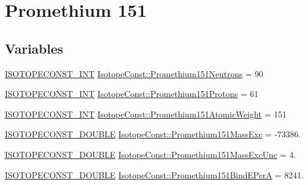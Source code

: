 \hypertarget{group___isotope_const-_promethium-_pm151}{}\section{Promethium 151}
\label{group___isotope_const-_promethium-_pm151}
\subsection*{Variables}
\begin{DoxyCompactItemize}
\item 
\mbox{\hyperlink{group___isotope_const-_macros_ga5f18360b3e99483a35c32d789e62621c}{I\+S\+O\+T\+O\+P\+E\+C\+O\+N\+S\+T\+\_\+\+I\+NT}} \mbox{\hyperlink{group___isotope_const-_promethium-_pm151_ga6160ed25a08d64d7d3850ccb4aec5af1}{Isotope\+Const\+::\+Promethium151\+Neutrons}} = 90
\item 
\mbox{\hyperlink{group___isotope_const-_macros_ga5f18360b3e99483a35c32d789e62621c}{I\+S\+O\+T\+O\+P\+E\+C\+O\+N\+S\+T\+\_\+\+I\+NT}} \mbox{\hyperlink{group___isotope_const-_promethium-_pm151_ga0a16e6a24cc0a7edbcaf29546572ce85}{Isotope\+Const\+::\+Promethium151\+Protons}} = 61
\item 
\mbox{\hyperlink{group___isotope_const-_macros_ga5f18360b3e99483a35c32d789e62621c}{I\+S\+O\+T\+O\+P\+E\+C\+O\+N\+S\+T\+\_\+\+I\+NT}} \mbox{\hyperlink{group___isotope_const-_promethium-_pm151_ga060f6be4c4ba25770dea254056cc5135}{Isotope\+Const\+::\+Promethium151\+Atomic\+Weight}} = 151
\item 
\mbox{\hyperlink{group___isotope_const-_macros_ga8f45a7272ce02c0b4c65c44636ed719a}{I\+S\+O\+T\+O\+P\+E\+C\+O\+N\+S\+T\+\_\+\+D\+O\+U\+B\+LE}} \mbox{\hyperlink{group___isotope_const-_promethium-_pm151_gafb046c96acd40778c01573580d655787}{Isotope\+Const\+::\+Promethium151\+Mass\+Exc}} = -\/73386.
\item 
\mbox{\hyperlink{group___isotope_const-_macros_ga8f45a7272ce02c0b4c65c44636ed719a}{I\+S\+O\+T\+O\+P\+E\+C\+O\+N\+S\+T\+\_\+\+D\+O\+U\+B\+LE}} \mbox{\hyperlink{group___isotope_const-_promethium-_pm151_ga68fd6cc94cf4a30f579165837a650769}{Isotope\+Const\+::\+Promethium151\+Mass\+Exc\+Unc}} = 4.
\item 
\mbox{\hyperlink{group___isotope_const-_macros_ga8f45a7272ce02c0b4c65c44636ed719a}{I\+S\+O\+T\+O\+P\+E\+C\+O\+N\+S\+T\+\_\+\+D\+O\+U\+B\+LE}} \mbox{\hyperlink{group___isotope_const-_promethium-_pm151_ga129cf74b9ee6ffa6c56e3f9517997b91}{Isotope\+Const\+::\+Promethium151\+Bind\+E\+PerA}} = 8241.
\item 

\end{DoxyCompactItemize}
